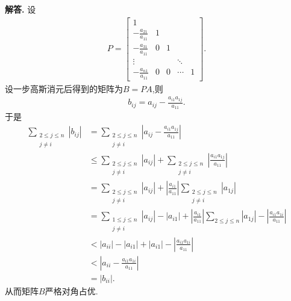 \documentclass[12pt, a4paper, oneside, UTF8]{ctexart}
\newenvironment{solution}{\par\noindent\textbf{解答. }}{\par}
\begin{document}
\begin{solution}
    设
    \begin{align*}
        P=
        \left[
            \begin{array}{ccccc}	
            1\\	
            -\frac{a_{21}}{a_{11}} & 1 \\
            -\frac{a_{31}}{a_{11}} & 0 & 1 \\ 
            \vdots & & & \ddots \\
           	-\frac{a_{n1}}{a_{11}} & 0 & 0 & \cdots & 1
            \end{array}
        \right].
    \end{align*}
    设一步高斯消元后得到的矩阵为$B=PA$,则
    \begin{align*}
        b_{ij}=a_{ij}-\frac{a_{i1}a_{1j}}{a_{11}}.
    \end{align*}
    于是
    \begin{align*}
        \sum\limits_{\substack{{2}\leq{j}\leq{n}\\{j}\neq{i}}}{\left\lvert {b_{ij}}\right\rvert }&=\sum\limits_{\substack{{2}\leq{j}\leq{n}\\{j}\neq{i}}}{\left\lvert {a_{ij}-\frac{a_{i1}a_{1j}}{a_{11}}}\right\rvert }\\
        &\leq\sum\limits_{\substack{{2}\leq{j}\leq{n}\\{j}\neq{i}}}{\left\lvert {a_{ij}}\right\rvert }+\sum\limits_{\substack{{2}\leq{j}\leq{n}\\{j}\neq{i}}}{\left\lvert {\frac{a_{i1}a_{1j}}{a_{11}}}\right\rvert }\\
        &=\sum\limits_{\substack{{2}\leq{j}\leq{n}\\{j}\neq{i}}}{\left\lvert {a_{ij}}\right\rvert }+{\left\lvert {\frac{a_{i1}}{a_{11}}}\right\rvert }\sum\limits_{\substack{{2}\leq{j}\leq{n}\\{j}\neq{i}}}{\left\lvert {a_{1j}}\right\rvert }\\
        &=\sum\limits_{\substack{{1}\leq{j}\leq{n}\\{j}\neq{i}}}{\left\lvert {a_{ij}}\right\rvert }-{\left\lvert {a_{i1}}\right\rvert}+{\left\lvert {\frac{a_{i1}}{a_{11}}}\right\rvert }\sum\limits_{{2}\leq{j}\leq{n}}{\left\lvert {a_{1j}}\right\rvert }-{\left\lvert {\frac{a_{i1}a_{1i}}{a_{11}}}\right\rvert }\\
        &<{\left\lvert{a_{ii}}\right\rvert}-{\left\lvert{a_{i1}}\right\rvert}+{\left\lvert{a_{i1}}\right\rvert}-{\left\lvert {\frac{a_{i1}a_{1i}}{a_{11}}}\right\rvert }\\
        &<{\left\lvert{a_{ii}-\frac{a_{i1}a_{1i}}{a_{11}}}\right\rvert}\\
        &={\left\lvert {b_{ii}}\right\rvert}.
    \end{align*}
    从而矩阵$B$严格对角占优.
\end{solution}
\end{document}

